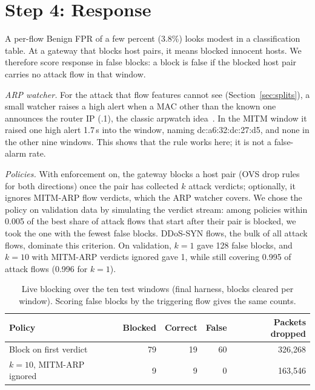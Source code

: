 \section{Step 4: Response}\label{sec:response}

A per-flow Benign FPR of a few percent (3.8\%) looks modest in a classification table. At a gateway that blocks host pairs, it means blocked innocent hosts. We therefore score response in false blocks: a block is false if the blocked host pair carries no attack flow in that window.

\emph{ARP watcher.} For the attack that flow features cannot see (Section~\ref{sec:splits}), a small watcher raises a high alert when a MAC other than the known one announces the router IP (.1), the classic arpwatch idea~\cite{arpwatch}. In the MITM window it raised one high alert 1.7\,s into the window, naming dc:a6:32:dc:27:d5, and none in the other nine windows. This shows that the rule works here; it is not a false-alarm rate.

\emph{Policies.} With enforcement on, the gateway blocks a host pair (OVS drop rules for both directions) once the pair has collected $k$ attack verdicts; optionally, it ignores MITM-ARP flow verdicts, which the ARP watcher covers. We chose the policy on validation data by simulating the verdict stream: among policies within 0.005 of the best share of attack flows that start after their pair is blocked, we took the one with the fewest false blocks. DDoS-SYN flows, the bulk of all attack flows, dominate this criterion. On validation, $k=1$ gave 128 false blocks, and $k=10$ with MITM-ARP verdicts ignored gave 1, while still covering 0.995 of attack flows (0.996 for $k=1$).

\begin{table}[t]
\centering
\caption{Live blocking over the ten test windows (final harness, blocks cleared per window). Scoring false blocks by the triggering flow gives the same counts.}
\label{tab:blocking}
\footnotesize
\setlength{\tabcolsep}{3pt}
\begin{tabular}{lrrrr}
\hline
Policy & Blocked & Correct & False & Packets dropped \\
\hline
Block on first verdict & 79 & 19 & 60 & 326,268 \\
$k=10$, MITM-ARP ignored & 9 & 9 & 0 & 163,546 \\
\hline
\end{tabular}
\end{table}

